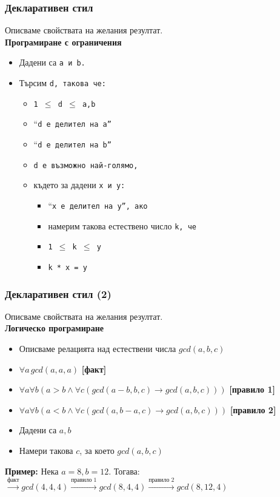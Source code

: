 \documentclass[alsotrans]{beamerswitch}
\begin{document}
\begin{frame}
  \frametitle{Декларативен стил}

  Описваме свойствата на желания резултат.\\[2ex]
  \textbf{Програмиране с ограничения}
  \begin{itemize}
  \item Дадени са \tt a и \tt b.
  \item Търсим \tt d, такова че:
    \begin{itemize}
    \item \tt{1 $\leq$ d $\leq$ a,b}
    \item ``\tt d е делител на \tt a''
    \item ``\tt d е делител на \tt b''
    \item \tt d е възможно най-голямо,
    \item където за дадени \tt x и \tt y:
      \begin{itemize}
      \item ``\tt x е делител на \tt y'', ако
      \item намерим такова естествено число \tt k, че
      \item \tt{1 $\leq$ k $\leq$ y}
      \item \tt k * \tt x = \tt y
      \end{itemize}
    \end{itemize}
  \end{itemize}
\end{frame}

\begin{frame}
  \frametitle{Декларативен стил (2)}

  Описваме свойствата на желания резултат.\\[2ex]
  \textbf{Логическо програмиране}
  \begin{itemize}
  \item Описваме релацията над естествени числа $gcd(a,b,c)$
  \item $\forall a \, gcd(a,a,a)$ \hspace{2ex}\textbf{[факт]}
  \item $\forall a\forall b ( a > b \land \forall c (gcd(a-b,b,c) \rightarrow gcd(a,b,c)))$ \hspace{2ex}\textbf{[правило 1]}
  \item $\forall a\forall b ( a < b \land \forall c (gcd(a,b-a,c) \rightarrow gcd(a,b,c)))$ \hspace{2ex}\textbf{[правило 2]}
  \item Дадени са $a, b$
  \item Намери такова $c$, за което $gcd(a,b,c)$
  \end{itemize}
  \pause
  \textbf{Пример:}
  Нека $a = 8, b = 12$. Тогава:\\
  $\xrightarrow{\text{факт}} gcd(4,4,4) \xrightarrow{\text{правило 1}} gcd(8,4,4) \xrightarrow{\text{правило 2}} gcd(8,12,4)$
\end{frame}
\end{document}

